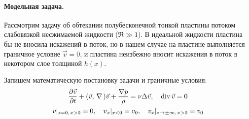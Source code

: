 \paragraph{Модельная задача.} Рассмотрим задачу об обтекании полубесконечной тонкой пластины потоком слабовязкой несжимаемой жидкости ($\Re \gg 1$). В идеальной жидкости пластина бы не вносила искажений в поток, но в нашем случае на пластине выполняется граничное условие $\vec{v}=0$, и    пластина неизбежно вносит искажения в поток в некотором слое толщиной $h(x)$. 

Запишем математическую постановку задачи и граничные условия:
\begin{gather}
	\pdv{\vec{v}}{t}+\qty(\vec{v},\,\nabla\,)\vec{v}+\frac{\nabla p}{\rho}=\nu \Delta \vec{v}, \quad \operatorname{div} \vec{v}=0\\
	v |_{z=0,\,x>0}=0, \quad
	v_x |_{x<0}=v_0, \quad
	v_x |_{z\to \pm\infty,\,x>0}=v_0
\end{gather}

